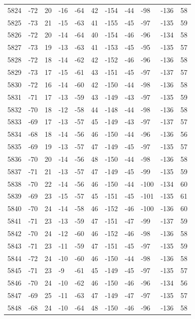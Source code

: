 \begin{table}[H]
\begin{tabular}{lllllllllll}
5824 & -72 & 20 & -16 & -64 & 42 & -154 & -44 & -98 & -136 & 58 \\
5825 & -73 & 21 & -15 & -63 & 41 & -155 & -45 & -97 & -135 & 59 \\
5826 & -72 & 20 & -14 & -64 & 40 & -154 & -46 & -96 & -134 & 58 \\
5827 & -73 & 19 & -13 & -63 & 41 & -153 & -45 & -95 & -135 & 57 \\
5828 & -72 & 18 & -14 & -62 & 42 & -152 & -46 & -96 & -136 & 58 \\
5829 & -73 & 17 & -15 & -61 & 43 & -151 & -45 & -97 & -137 & 57 \\
5830 & -72 & 16 & -14 & -60 & 42 & -150 & -44 & -98 & -136 & 58 \\
5831 & -71 & 17 & -13 & -59 & 43 & -149 & -43 & -97 & -135 & 59 \\
5832 & -70 & 18 & -12 & -58 & 44 & -148 & -44 & -98 & -136 & 58 \\
5833 & -69 & 17 & -13 & -57 & 45 & -149 & -43 & -97 & -137 & 57 \\
5834 & -68 & 18 & -14 & -56 & 46 & -150 & -44 & -96 & -136 & 56 \\
5835 & -69 & 19 & -13 & -57 & 47 & -149 & -45 & -97 & -135 & 57 \\
5836 & -70 & 20 & -14 & -56 & 48 & -150 & -44 & -98 & -136 & 58 \\
5837 & -71 & 21 & -13 & -57 & 47 & -149 & -45 & -99 & -135 & 59 \\
5838 & -70 & 22 & -14 & -56 & 46 & -150 & -44 & -100 & -134 & 60 \\
5839 & -69 & 23 & -15 & -57 & 45 & -151 & -45 & -101 & -135 & 61 \\
5840 & -70 & 24 & -14 & -58 & 46 & -152 & -46 & -100 & -136 & 60 \\
5841 & -71 & 23 & -13 & -59 & 47 & -151 & -47 & -99 & -137 & 59 \\
5842 & -70 & 24 & -12 & -60 & 46 & -152 & -46 & -98 & -136 & 58 \\
5843 & -71 & 23 & -11 & -59 & 47 & -151 & -45 & -97 & -135 & 59 \\
5844 & -72 & 24 & -10 & -60 & 46 & -150 & -44 & -98 & -136 & 58 \\
5845 & -71 & 23 & -9 & -61 & 45 & -149 & -45 & -97 & -135 & 57 \\
5846 & -70 & 24 & -10 & -62 & 46 & -150 & -46 & -96 & -134 & 56 \\
5847 & -69 & 25 & -11 & -63 & 47 & -149 & -47 & -97 & -135 & 57 \\
5848 & -68 & 24 & -10 & -64 & 48 & -150 & -46 & -96 & -136 & 58 \\

\end{tabular}
\end{table}
